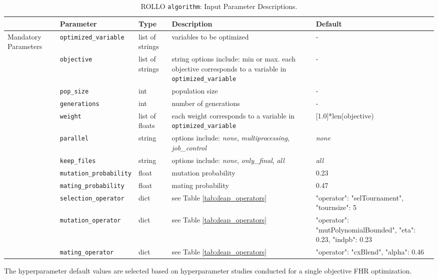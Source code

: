 \begin{table}[]
    \centering
    \onehalfspacing
    \caption{\acrfull{ROLLO} \texttt{algorithm}: Input Parameter Descriptions.}
	\label{tab:algorithm-inputs}
    \footnotesize
    \begin{tabular}{l|lp{1.7cm}p{4cm}p{3cm}}
    \hline
    & \textbf{Parameter} & \textbf{Type} & \textbf{Description} & \textbf{Default} \\
    \hline
    \multirow{9}{1.8cm}{Mandatory Parameters} 
    & \texttt{optimized\_variable} & list of strings & variables to be optimized & -\\
    \cline{2-5}
    & \texttt{objective} & list of strings & string options include: min or max.
    each objective corresponds to a variable in \texttt{optimized\_variable} & -\\
    \cline{2-5}
    & \texttt{pop\_size} & int & population size & -\\
    \cline{2-5}
    & \texttt{generations} & int & number of generations & -\\
    \hline
    \multirow{9}{1.8cm}{Optional Parameters} 
    & \texttt{weight} & list of floats & each weight corresponds to a variable in \texttt{optimized\_variable} & \scriptsize{[1.0]*len(objective)}\\
    \cline{2-5}
    & \texttt{parallel} & string & options include: \textit{none}, \textit{multiprocessing}, \textit{job\_control} & \textit{none} \\
    \cline{2-5}
    & \texttt{keep\_files} & string & options include: \textit{none}, \textit{only\_final}, \textit{all} & \textit{all} \\
    \cline{2-5}
    & \texttt{mutation\_probability} & float & mutation probability & 0.23 \\
    \cline{2-5}
    & \texttt{mating\_probability} & float & mating probability & 0.47 \\
    \cline{2-5}
    & \texttt{selection\_operator} & dict & see Table \ref{tab:deap_operators} & \scriptsize{{"operator": "selTournament", "tournsize": 5}}\\
    \cline{2-5}
    & \texttt{mutation\_operator} & dict & see Table \ref{tab:deap_operators} & \scriptsize{{"operator": "mutPolynomialBounded", "eta": 0.23, "indpb": 0.23}}\\
    \cline{2-5}
    & \texttt{mating\_operator} & dict & see Table \ref{tab:deap_operators} & \scriptsize{{"operator": "cxBlend", "alpha": 0.46}}\\
    \hline 
    \end{tabular}
    \end{table}
The hyperparameter default values are selected based on hyperparameter studies conducted 
for a single objective \gls{FHR} optimization. 

